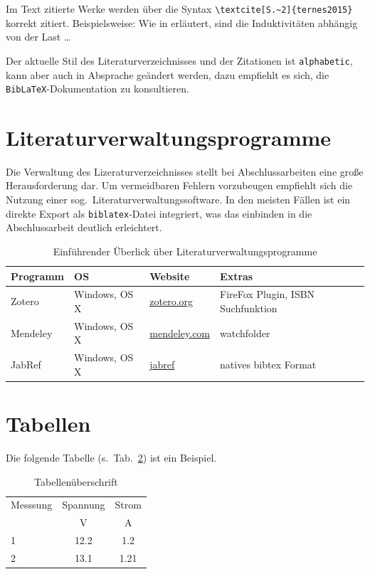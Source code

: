 Im Text zitierte Werke werden über die Syntax \verb|\textcite[S.~2]{ternes2015}| korrekt zitiert. Beispielsweise: Wie in \textcite[S.~2]{ternes2015} erläutert, sind die Induktivitäten abhängig von der Last \ldots

Der aktuelle Stil des Literaturverzeichnisses und der Zitationen ist \verb|alphabetic|, kann aber auch in Absprache geändert werden, dazu empfiehlt es sich, die \verb|BibLaTeX|-Dokumentation zu konsultieren.

\section{Literaturverwaltungsprogramme}

Die Verwaltung des Lizeraturverzeichnisses stellt bei Abschlussarbeiten eine große Herausforderung dar. Um vermeidbaren Fehlern vorzubeugen empfiehlt sich die Nutzung einer sog.\ Literaturverwaltungssoftware. In den meisten Fällen ist ein direkte Export als \verb|biblatex|-Datei integriert, was das einbinden in die Abschlussarbeit deutlich erleichtert.  

\begin{table}[htb]
	\caption{Einführender Überlick über Literaturverwaltungsprogramme}
	\label{tab:literaturverwaltung}
	\begin{tabularx}{1.0\textwidth}{l l l X}
		\toprule
			Programm & OS & Website & Extras\\
		\midrule
			Zotero & Windows, OS X & \href{https://www.zotero.org}{zotero.org} & FireFox Plugin, ISBN Suchfunktion\\
			Mendeley & Windows, OS X & \href{https://www.mendeley.com/}{mendeley.com} & watchfolder\\
			JabRef	& Windows, OS X & \href{http://jabref.sourceforge.net/}{jabref} & natives bibtex Format \\
		\bottomrule
	\end{tabularx}
\end{table}

\section{Tabellen}\label{sec:tables}

Die folgende Tabelle (s.~Tab.~\ref{tab:tabelle-test}) ist ein Beispiel.

\begin{table}[htb]
		\caption{Tabellenüberschrift}
		\label{tab:tabelle-test}
		\centering
	\begin{tabularx}{0.4\textwidth}{l c c}
			\toprule
			Messsung	&	Spannung		&	Strom	\\
			&	\si{\volt}	&	\si{\ampere} \\
			\midrule
			1			&	12.2			&	1.2	\\
			2			&	13.1			&	1.21 \\
			\bottomrule
	\end{tabularx}
\end{table}



